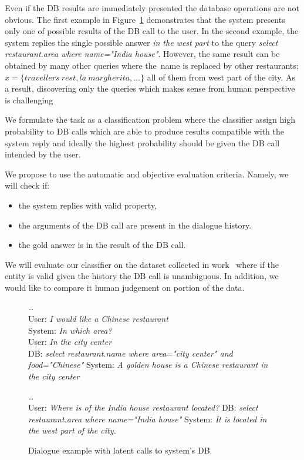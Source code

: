 \documentclass[11pt]{article}
\def\sys#1{{\color{purple}System: \it #1}}
\def\usr#1{{\color{brown}User: \it #1}}
\def\api#1{{\color{green}DB: \it #1}}
\begin{document}
Even if the DB results are immediately presented the database operations are not obvious.  
The first example in Figure~\ref{fig:apicall} demonstrates that the system presents only one of possible results of the DB call to the user.
In the second example, the system replies the single possible answer {\it in the west part} to the query {\it select restaurant.area where name="India house"}.
However, the same result can be obtained by many other queries where the~name is replaced by other restaurants; $x=\{travellers\ rest, la\ margherita, \ldots\}$ all of them from west part of the city.
As a result, discovering only the queries which makes sense from human perspective is challenging 

We formulate the task as a classification problem where the classifier assign high probability to DB calls which are able to produce results compatible with the system reply and ideally the highest probability should be given the DB call intended by the user.

We propose to use the automatic and objective evaluation criteria. 
Namely, we will check if:
\begin{itemize}
    \item the system replies with valid property,
    \item the arguments of the DB call are present in the dialogue history.
    \item the gold answer is in the result of the DB call.
\end{itemize}
We will evaluate our classifier on the dataset collected in work~\cite{platek2016wochat} where if the entity is valid given the history the DB call is unambiguous. 
In addition, we would like to compare it human judgement on portion of the data.
\begin{figure}[!ht]
    \dots \\
    \usr{I would like a Chinese restaurant} \\
    \sys{In which area?} \\
    \usr{In the city center} \\
    \api{select restaurant.name where area="city center" and food="Chinese"}
    \sys{A golden house is a Chinese restaurant in the city center} 

    \dots \\
    \usr{Where is of the India house restaurant located?}
    \api{select restaurant.area where name="India house"}
    \sys{It is located in the west part of the city.}
    \caption{Dialogue example with latent calls to system's DB.}
\label{fig:apicall}
\end{figure}
\end{document}
